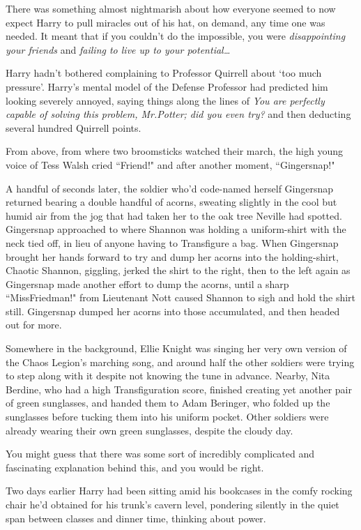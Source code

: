 There was something almost nightmarish about how everyone seemed to now expect Harry to pull miracles out of his hat, on demand, any time one was needed. It meant that if you couldn't do the impossible, you were \emph{disappointing your friends} and \emph{failing to live up to your potential{\ldots}}

Harry hadn't bothered complaining to Professor Quirrell about `too much pressure'. Harry's mental model of the Defense Professor had predicted him looking severely annoyed, saying things along the lines of \emph{You are perfectly capable of solving this problem, Mr.\?Potter; did you even try?} and then deducting several hundred Quirrell points.

From above, from where two broomsticks watched their march, the high young voice of Tess Walsh cried ``Friend!" and after another moment, ``Gingersnap!"

A handful of seconds later, the soldier who'd code-named herself Gingersnap returned bearing a double handful of acorns, sweating slightly in the cool but humid air from the jog that had taken her to the oak tree Neville had spotted. Gingersnap approached to where Shannon was holding a uniform-shirt with the neck tied off, in lieu of anyone having to Transfigure a bag. When Gingersnap brought her hands forward to try and dump her acorns into the holding-shirt, Chaotic Shannon, giggling, jerked the shirt to the right, then to the left again as Gingersnap made another effort to dump the acorns, until a sharp ``Miss\?Friedman!" from Lieutenant Nott caused Shannon to sigh and hold the shirt still. Gingersnap dumped her acorns into those accumulated, and then headed out for more.

Somewhere in the background, Ellie Knight was singing her very own version of the Chaos Legion's marching song, and around half the other soldiers were trying to step along with it despite not knowing the tune in advance. Nearby, Nita Berdine, who had a high Transfiguration score, finished creating yet another pair of green sunglasses, and handed them to Adam Beringer, who folded up the sunglasses before tucking them into his uniform pocket. Other soldiers were already wearing their own green sunglasses, despite the cloudy day.

You might guess that there was some sort of incredibly complicated and fascinating explanation behind this, and you would be right.

Two days earlier Harry had been sitting amid his bookcases in the comfy rocking chair he'd obtained for his trunk's cavern level, pondering silently in the quiet span between classes and dinner time, thinking about power.

